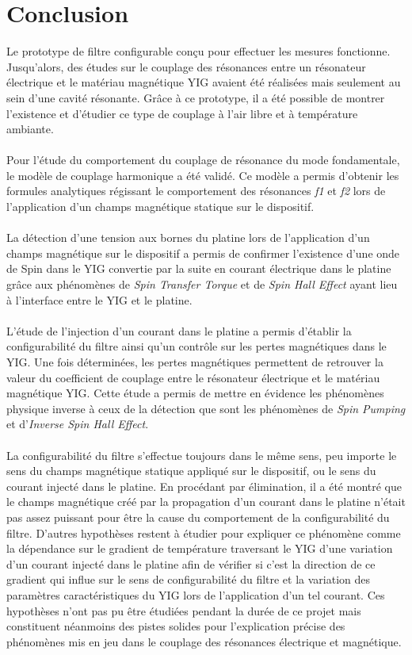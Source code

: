 \documentclass[12pt,fleqn]{book} %
\begin{document}
\setcounter{part}{-3}
\part{Conclusion}
Le prototype de filtre configurable conçu pour effectuer les mesures fonctionne. Jusqu'alors, des études sur le couplage des résonances entre un résonateur électrique et le matériau magnétique YIG avaient été réalisées mais seulement au sein d'une cavité résonante. Grâce à ce prototype, il a été possible de montrer l'existence et d'étudier ce type de couplage à l'air libre et à température ambiante.  
~\\\\Pour l'étude du comportement du couplage de résonance du mode fondamentale, le modèle de couplage harmonique a été validé. Ce modèle a permis d'obtenir les formules analytiques régissant le comportement des résonances \emph{f1} et \emph{f2} lors de l'application d'un champs magnétique statique sur le dispositif.
~\\\\La détection d'une tension aux bornes du platine lors de l'application d'un champs magnétique sur le dispositif a permis de confirmer l'existence d'une onde de Spin dans le YIG convertie par la suite en courant électrique dans le platine grâce aux phénomènes de \emph{Spin Transfer Torque} et de \emph{Spin Hall Effect} ayant lieu à l'interface entre le YIG et le platine.
~\\\\L'étude de l'injection d'un courant dans le platine a permis d'établir la configurabilité du filtre ainsi qu'un contrôle sur les pertes magnétiques dans le YIG. Une fois déterminées, les pertes magnétiques permettent de retrouver la valeur du coefficient de couplage entre le résonateur électrique et le matériau magnétique YIG. Cette étude a permis de mettre en évidence les phénomènes physique inverse à ceux de la détection que sont les phénomènes de \emph{Spin Pumping} et d'\emph{Inverse Spin Hall Effect}.
~\\\\La configurabilité du filtre s'effectue toujours dans le même sens, peu importe le sens du champs magnétique statique appliqué sur le dispositif, ou le sens du courant injecté dans le platine. En procédant par élimination, il a été montré que le champs magnétique créé par la propagation d'un courant dans le platine n'était pas assez puissant pour être la cause du comportement de la configurabilité du filtre. D'autres hypothèses restent à étudier pour expliquer ce phénomène comme la dépendance sur le gradient de température traversant le YIG d'une variation d'un courant injecté dans le platine afin de vérifier si c'est la direction de ce gradient qui influe sur le sens de configurabilité du filtre et la variation des paramètres caractéristiques du YIG lors de l'application d'un tel courant. Ces hypothèses n'ont pas pu être étudiées pendant la durée de ce projet mais constituent néanmoins des pistes solides pour l'explication précise des phénomènes mis en jeu dans le couplage des résonances électrique et magnétique.
\end{document}
